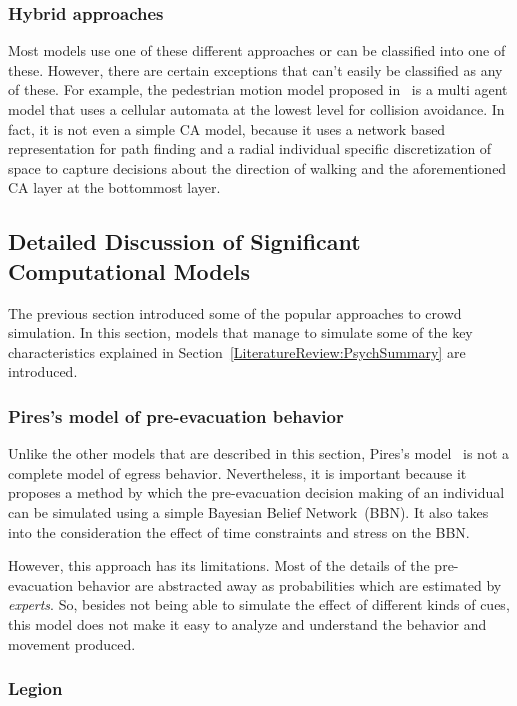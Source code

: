 \subsubsection{Hybrid approaches}
Most models use one of these different approaches or can be classified into one of these. However, there are certain exceptions that can't easily be classified as any of these. For example, the pedestrian motion model proposed in~\cite{Bierlaire:2003uj} is a multi agent model that uses a cellular automata at the lowest level for collision avoidance. In fact, it is not even a simple CA model, because it uses a network based representation for path finding and a radial individual specific discretization of space to capture decisions about the direction of walking and the aforementioned CA layer at the bottommost layer.

\subsection{Detailed Discussion of Significant Computational Models}
\label{LiteratureReview:DetailedModels}

The previous section introduced some of the popular approaches to crowd simulation. In this section, models that manage to simulate some of the key characteristics explained in Section~\ref{LiteratureReview:PsychSummary} are introduced.

\subsubsection{Pires's model of pre-evacuation behavior}

Unlike the other models that are described in this section, Pires's model~\cite{Pires:2005gs} is not a complete model of egress behavior. Nevertheless, it is important because it proposes a method by which the pre-evacuation decision making of an individual can be simulated using a simple Bayesian Belief Network~(BBN). It also takes into the consideration the effect of time constraints and stress on the BBN.

However, this approach has its limitations. Most of the details of the pre-evacuation behavior are abstracted away as probabilities which are estimated by \emph{experts}. So, besides not being able to simulate the effect of different kinds of cues, this model does not make it easy to analyze and understand the behavior and movement produced.

\subsubsection{Legion}

